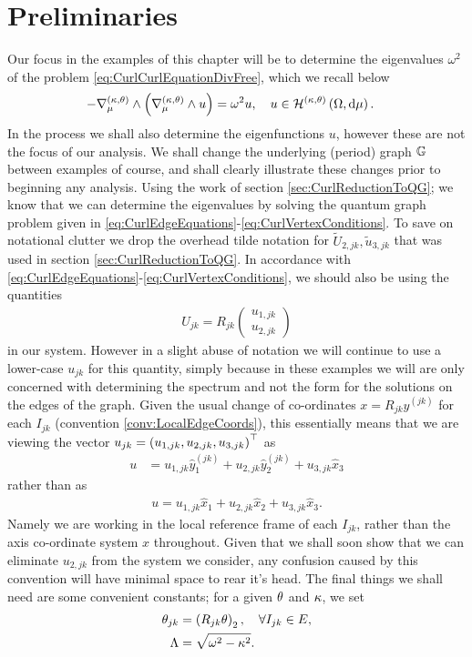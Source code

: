 \section{Preliminaries} \label{sec:ExamplePrelims}
Our focus in the examples of this chapter will be to determine the eigenvalues $\omega^2$ of the problem \eqref{eq:CurlCurlEquationDivFree}, which we recall below
\begin{align*}
	-\nabla_{\mu}^{\left( \kappa, \theta \right)}\wedge\left( \nabla_{\mu}^{\left( \kappa, \theta \right)}\wedge u \right) &= \omega^2 u, \quad u\in\mathcal{H}^{\left( \kappa, \theta \right)}\left( \Omega, \mathrm{d}\mu \right).
\end{align*}
In the process we shall also determine the eigenfunctions $u$, however these are not the focus of our analysis.
We shall change the underlying (period) graph $\mathbb{G}$ between examples of course, and shall clearly illustrate these changes prior to beginning any analysis.
Using the work of section \ref{sec:CurlReductionToQG}; we know that we can determine the eigenvalues by solving the quantum graph problem given in \eqref{eq:CurlEdgeEquations}-\eqref{eq:CurlVertexConditions}.
To save on notational clutter we drop the overhead tilde notation for $\widetilde{U}_{2,jk},\widetilde{u}_{3,jk}$ that was used in section \ref{sec:CurlReductionToQG}.
In accordance with \eqref{eq:CurlEdgeEquations}-\eqref{eq:CurlVertexConditions}, we should also be using the quantities 
\begin{align*}
	U_{jk} = R_{jk}\begin{pmatrix} u_{1,jk} \\ u_{2,jk} \end{pmatrix}
\end{align*}
in our system.
However in a slight abuse of notation we will continue to use a lower-case $u_{jk}$ for this quantity, simply because in these examples we will are only concerned with determining the spectrum and not the form for the solutions on the edges of the graph. 
Given the usual change of co-ordinates $x=R_{jk}y^{(jk)}$ for each $I_{jk}$ (convention \ref{conv:LocalEdgeCoords}), this essentially means that we are viewing the vector $u_{jk}=\left( u_{1,jk},u_{2,jk},u_{3,jk} \right)^\top$ as 
\begin{align*}
	u &= u_{1,jk}\hat{y}^{(jk)}_1 + u_{2,jk}\hat{y}^{(jk)}_2 + u_{3,jk}\hat{x}_3
\end{align*}
rather than as 
\begin{align*}
u = u_{1,jk}\hat{x}_1 + u_{2,jk}\hat{x}_2 + u_{3,jk}\hat{x}_3.
\end{align*}
Namely we are working in the local reference frame of each $I_{jk}$, rather than the axis co-ordinate system $x$ throughout. 
Given that we shall soon show that we can eliminate $u_{2,jk}$ from the system we consider, any confusion caused by this convention will have minimal space to rear it's head.
The final things we shall need are some convenient constants; for a given $\theta$ and $\kappa$, we set
\begin{align*}
	\theta_{jk} &= \left( R_{jk}\theta \right)_2, \quad\forall I_{jk}\in E,\\
	\Lambda &= \sqrt{\omega^2 - \kappa^2}.
\end{align*}

